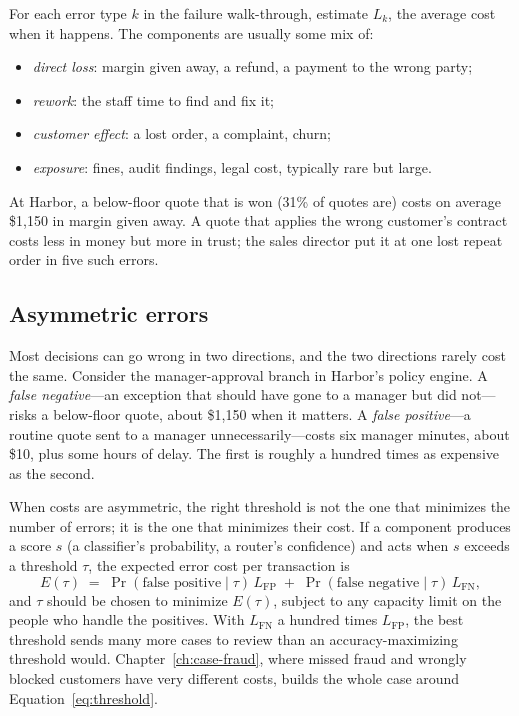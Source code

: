 For each error type $k$ in the failure walk-through, estimate $L_k$, the average cost when it happens. The components are usually some mix of:
\begin{itemize}[itemsep=1pt]
  \item \emph{direct loss}: margin given away, a refund, a payment to the wrong party;
  \item \emph{rework}: the staff time to find and fix it;
  \item \emph{customer effect}: a lost order, a complaint, churn;
  \item \emph{exposure}: fines, audit findings, legal cost, typically rare but large.
\end{itemize}
At Harbor, a below-floor quote that is won (31\% of quotes are) costs on average \$1{,}150 in margin given away. A quote that applies the wrong customer's contract costs less in money but more in trust; the sales director put it at one lost repeat order in five such errors.

\subsection{Asymmetric errors}

Most decisions can go wrong in two directions, and the two directions rarely cost the same. Consider the manager-approval branch in Harbor's policy engine. A \emph{false negative}---an exception that should have gone to a manager but did not---risks a below-floor quote, about \$1{,}150 when it matters. A \emph{false positive}---a routine quote sent to a manager unnecessarily---costs six manager minutes, about \$10, plus some hours of delay. The first is roughly a hundred times as expensive as the second.

When costs are asymmetric, the right threshold is not the one that minimizes the number of errors; it is the one that minimizes their cost. If a component produces a score $s$ (a classifier's probability, a router's confidence) and acts when $s$ exceeds a threshold $\tau$, the expected error cost per transaction is
\begin{equation}
  E(\tau) \;=\; \Pr(\text{false positive} \mid \tau)\, L_{\text{FP}} \;+\; \Pr(\text{false negative} \mid \tau)\, L_{\text{FN}},
  \label{eq:threshold}
\end{equation}
and $\tau$ should be chosen to minimize $E(\tau)$, subject to any capacity limit on the people who handle the positives. With $L_{\text{FN}}$ a hundred times $L_{\text{FP}}$, the best threshold sends many more cases to review than an accuracy-maximizing threshold would. Chapter~\ref{ch:case-fraud}, where missed fraud and wrongly blocked customers have very different costs, builds the whole case around Equation~\eqref{eq:threshold}.

